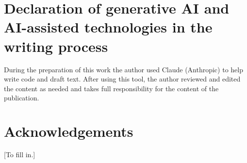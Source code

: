 \documentclass[preprint,12pt]{elsarticle}
\begin{document}
\section*{Declaration of generative AI and AI-assisted technologies in the writing process}
During the preparation of this work the author used Claude (Anthropic) to help write code and draft text. After using this tool, the author reviewed and edited the content as needed and takes full responsibility for the content of the publication.

\section*{Acknowledgements}
[To fill in.]



\end{document}
